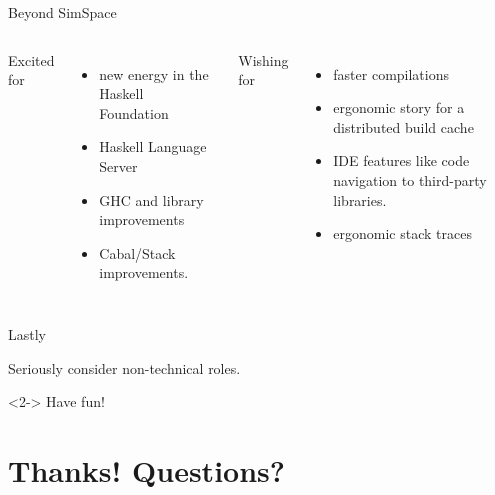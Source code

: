 \documentclass[aspectratio=169,ignorenonframetext]{beamer}
\begin{document}
\begin{frame}{Beyond SimSpace}
	\begin{columns}
		Excited for
		\begin{itemize}
			\item new energy in the Haskell Foundation
			\item Haskell Language Server
			\item GHC and library improvements
			\item Cabal/Stack improvements.
		\end{itemize}
		Wishing for
		\begin{itemize}
			\item faster compilations
			\item ergonomic story for a distributed build cache
			\item IDE features like code navigation to third-party libraries.
			\item ergonomic stack traces
		\end{itemize}
	\end{columns}
\end{frame}

\begin{frame}{Lastly}
	\begin{exampleblock}{}
		Seriously consider non-technical roles.
	\end{exampleblock}
	\begin{exampleblock}<2->{}
		Have fun!
	\end{exampleblock}
\end{frame}

\section{Thanks! Questions?}
\end{document}
